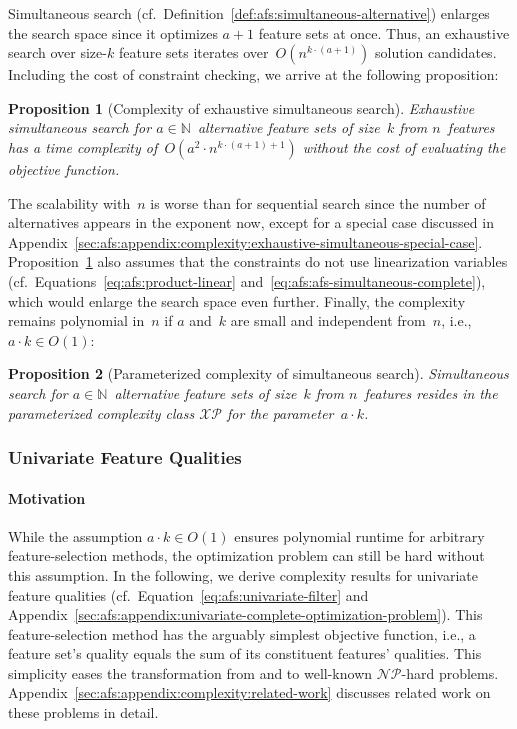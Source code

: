 \documentclass{article}
\newtheorem{proposition}{Proposition}
\theoremstyle{definition}
\begin{document}
Simultaneous search (cf.~Definition~\ref{def:afs:simultaneous-alternative}) enlarges the search space since it optimizes $a+1$ feature sets at once.
Thus, an exhaustive search over size-$k$ feature sets iterates over~$O(n^{k \cdot (a+1)})$ solution candidates.
Including the cost of constraint checking, we arrive at the following proposition:
%
\begin{proposition}[Complexity of exhaustive simultaneous search]
	Exhaustive simultaneous search for $a \in \mathbb{N}$~alternative feature sets of size~$k$ from $n$~features has a time complexity of~$O(a^2 \cdot n^{k \cdot (a+1) + 1})$ without the cost of evaluating the objective function.
	\label{prop:afs:complexity-exhaustive-simultaneuos}
\end{proposition}
%
The scalability with~$n$ is worse than for sequential search since the number of alternatives appears in the exponent now, except for a special case discussed in Appendix~\ref{sec:afs:appendix:complexity:exhaustive-simultaneous-special-case}.
Proposition~\ref{prop:afs:complexity-exhaustive-simultaneuos} also assumes that the constraints do not use linearization variables (cf.~Equations~\ref{eq:afs:product-linear} and~\ref{eq:afs:afs-simultaneous-complete}), which would enlarge the search space even further.
Finally, the complexity remains polynomial in~$n$ if $a$ and~$k$ are small and independent from~$n$, i.e., $a \cdot k \in O(1)$:
%
\begin{proposition}[Parameterized complexity of simultaneous search]
	Simultaneous search for $a \in \mathbb{N}$~alternative feature sets of size~$k$ from $n$~features resides in the parameterized complexity class $\mathcal{XP}$ for the parameter~$a \cdot k$.
	\label{prop:afs:complexity-simultaneuos-xp}
\end{proposition}

\subsubsection{Univariate Feature Qualities}
\label{sec:afs:approach:complexity:univariate}

\paragraph{Motivation}

While the assumption $a \cdot k \in O(1)$ ensures polynomial runtime for arbitrary feature-selection methods, the optimization problem can still be hard without this assumption.
In the following, we derive complexity results for univariate feature qualities (cf.~Equation~\ref{eq:afs:univariate-filter} and Appendix~\ref{sec:afs:appendix:univariate-complete-optimization-problem}).
This feature-selection method has the arguably simplest objective function, i.e., a feature set's quality equals the sum of its constituent features' qualities.
This simplicity eases the transformation from and to well-known $\mathcal{NP}$-hard problems.
Appendix~\ref{sec:afs:appendix:complexity:related-work} discusses related work on these problems in detail.
\end{document}
